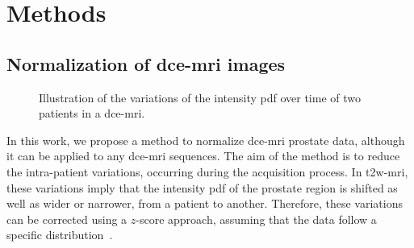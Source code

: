 \section{Methods}\label{sec:method}

\subsection{Normalization of \ac{dce}-\ac{mri} images}\label{sec:norm}

\begin{figure}
  \centering
  \hspace*{\fill}
   \hfill
  \hspace*{\fill}
  \caption{Illustration of the variations of the intensity \acs*{pdf} over time of two patients in a \ac{dce}-\ac{mri}.}
  \label{fig:heatmap}
\end{figure}

In this work, we propose a method to normalize \ac{dce}-\ac{mri} prostate data, although it can be applied to any \ac{dce}-\ac{mri} sequences.
The aim of the method is to reduce the intra-patient variations, occurring during the acquisition process.
In \ac{t2w}-\ac{mri}, these variations imply that the intensity \ac{pdf} of the prostate region is shifted as well as wider or narrower, from a patient to another.
Therefore, these variations can be corrected using a $z$-score approach, assuming that the data follow a specific distribution~\citep{lemaitre2016normalization}.

